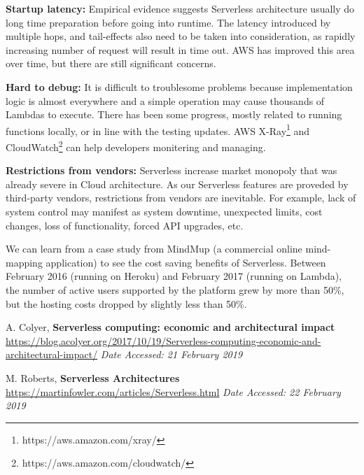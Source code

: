 \documentclass[11pt]{article}
\begin{document}
\begin{itemize*}
  \item {\bf Startup latency:} Empirical evidence suggests Serverless architecture usually do long time preparation before going into runtime. The latency introduced by multiple hops, and tail-effects also need to be taken into consideration\cite{no1}, as rapidly increasing number of request will result in time out. AWS has improved this area over time, but there are still significant concerns.
  \item {\bf Hard to debug:} It is difficult to troublesome problems because implementation logic is almost everywhere and a simple operation may cause thousands of Lambdas to execute. There has been some progress, mostly related to running functions locally, or in line with the testing updates. AWS X-Ray\footnote{https://aws.amazon.com/xray/} and CloudWatch\footnote{https://aws.amazon.com/cloudwatch/} can help developers monitering and managing. 
  \item {\bf Restrictions from vendors:} Serverless increase market monopoly that was already severe in Cloud architecture. As our Serverless features are proveded by third-party vendors, restrictions from vendors are inevitable. For example, lack of system control may manifest as system downtime, unexpected limits, cost changes, loss of functionality, forced API upgrades, etc.\cite{no2}
\end{itemize*}
We can learn from a case study from MindMup (a commercial online mind-mapping application) to see the cost saving benefits of Serverless. Between February 2016 (running on Heroku) and February 2017 (running on Lambda), the number of active users supported by the platform grew by more than 50\%, but the hosting costs dropped by slightly less than 50\%\cite{no1}. 

{\footnotesize
\begin{thebibliography}{9}
    A. Colyer, \textbf{Serverless computing: economic and architectural impact}
    \url{https://blog.acolyer.org/2017/10/19/Serverless-computing-economic-and-architectural-impact/}
    \textit{Date Accessed: 21 February 2019}
    
    M. Roberts, \textbf{Serverless Architectures}
    \url{https://martinfowler.com/articles/Serverless.html}
    \textit{Date Accessed: 22 February 2019}
\end{thebibliography}
}
\end{document}
